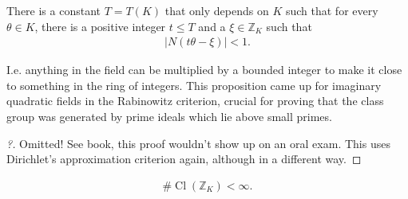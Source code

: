 \begin{proposition}[?]

There is a constant \(T = T(K)\) that only depends on \(K\) such that
for every \(\theta\in K\), there is a positive integer \(t \leq T\) and
a \(\xi \in {\mathbb{Z}}_K\) such that
\begin{align*}
{\left\lvert {N(t \theta - \xi ) } \right\rvert} < 1
.\end{align*}

\end{proposition}

\begin{remark}

I.e. anything in the field can be multiplied by a bounded integer to
make it close to something in the ring of integers. This proposition
came up for imaginary quadratic fields in the Rabinowitz criterion,
crucial for proving that the class group was generated by prime ideals
which lie above small primes.

\end{remark}

\begin{proof}[?]

Omitted! See book, this proof wouldn't show up on an oral exam. This
uses Dirichlet's approximation criterion again, although in a different
way.

\end{proof}

\begin{theorem}

\begin{align*}
\# \operatorname{Cl}({\mathbb{Z}}_K) < \infty 
.\end{align*}

\end{theorem}

